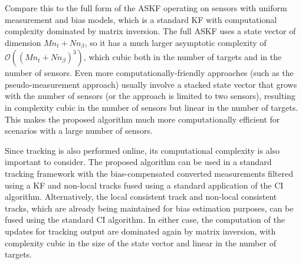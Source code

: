 \documentclass[journal]{IEEEtran}
\begin{document}
Compare this to the full form of the ASKF operating on sensors with uniform measurement and bias models, which is a standard KF with computational complexity dominated by matrix inversion. The full ASKF uses a state vector of dimension $M n_{t} + N n_{\beta}$, so it has a much larger asymptotic complexity of $\mathcal{O}((M n_{t} + N n_{\beta})^3)$, which cubic both in the number of targets and in the number of sensors. Even more computationally-friendly approaches (such as the pseudo-measurement approach) usually involve a stacked state vector that grows with the number of sensors (or the approach is limited to two sensors), resulting in complexity cubic in the number of sensors but linear in the number of targets. This makes the proposed algorithm much more computationally efficient for scenarios with a large number of sensors.

Since tracking is also performed online, its computational complexity is also important to consider. The proposed algorithm can be used in a standard tracking framework with the bias-compensated converted measurements filtered using a KF and non-local tracks fused using a standard application of the CI algorithm. Alternatively, the local consistent track and non-local consistent tracks, which are already being maintained for bias estimation purposes, can be fused using the standard CI algorithm. In either case, the computation of the updates for tracking output are dominated again by matrix inversion, with complexity cubic in the size of the state vector and linear in the number of targets.
\end{document}
